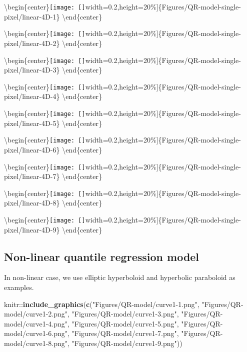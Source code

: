 \documentclass[11pt,a4paper,]{article}
\newenvironment{Shaded}{\begin{snugshade}}{\end{snugshade}}
\newcommand{\KeywordTok}[1]{\textcolor[rgb]{0.13,0.29,0.53}{\textbf{{#1}}}}
\newcommand{\StringTok}[1]{\textcolor[rgb]{0.31,0.60,0.02}{{#1}}}
\newcommand{\NormalTok}[1]{{#1}}
\theoremstyle{definition}
\theoremstyle{definition}
\theoremstyle{remark}
\begin{document}
\textbackslash{}begin\{center\}\texttt{[image: []}width=0.2\linewidth,height=20\%{]}\{Figures/QR-model-single-pixel/linear-4D-1\}
\textbackslash{}end\{center\}

\textbackslash{}begin\{center\}\texttt{[image: []}width=0.2\linewidth,height=20\%{]}\{Figures/QR-model-single-pixel/linear-4D-2\}
\textbackslash{}end\{center\}

\textbackslash{}begin\{center\}\texttt{[image: []}width=0.2\linewidth,height=20\%{]}\{Figures/QR-model-single-pixel/linear-4D-3\}
\textbackslash{}end\{center\}

\textbackslash{}begin\{center\}\texttt{[image: []}width=0.2\linewidth,height=20\%{]}\{Figures/QR-model-single-pixel/linear-4D-4\}
\textbackslash{}end\{center\}

\textbackslash{}begin\{center\}\texttt{[image: []}width=0.2\linewidth,height=20\%{]}\{Figures/QR-model-single-pixel/linear-4D-5\}
\textbackslash{}end\{center\}

\textbackslash{}begin\{center\}\texttt{[image: []}width=0.2\linewidth,height=20\%{]}\{Figures/QR-model-single-pixel/linear-4D-6\}
\textbackslash{}end\{center\}

\textbackslash{}begin\{center\}\texttt{[image: []}width=0.2\linewidth,height=20\%{]}\{Figures/QR-model-single-pixel/linear-4D-7\}
\textbackslash{}end\{center\}

\textbackslash{}begin\{center\}\texttt{[image: []}width=0.2\linewidth,height=20\%{]}\{Figures/QR-model-single-pixel/linear-4D-8\}
\textbackslash{}end\{center\}

\textbackslash{}begin\{center\}\texttt{[image: []}width=0.2\linewidth,height=20\%{]}\{Figures/QR-model-single-pixel/linear-4D-9\}
\textbackslash{}end\{center\}

\subsection{Non-linear quantile regression
model}\label{non-linear-quantile-regression-model}

In non-linear case, we use elliptic hyperboloid and hyperbolic
paraboloid as examples.

\begin{Shaded}
\begin{Highlighting}[]
\NormalTok{knitr::}\KeywordTok{include_graphics}\NormalTok{(}\KeywordTok{c}\NormalTok{(}\StringTok{"Figures/QR-model/curve1-1.png"}\NormalTok{,}
                          \StringTok{"Figures/QR-model/curve1-2.png"}\NormalTok{,}
                          \StringTok{"Figures/QR-model/curve1-3.png"}\NormalTok{,}
                          \StringTok{"Figures/QR-model/curve1-4.png"}\NormalTok{,}
                          \StringTok{"Figures/QR-model/curve1-5.png"}\NormalTok{,}
                          \StringTok{"Figures/QR-model/curve1-6.png"}\NormalTok{,}
                          \StringTok{"Figures/QR-model/curve1-7.png"}\NormalTok{,}
                          \StringTok{"Figures/QR-model/curve1-8.png"}\NormalTok{,}
                          \StringTok{"Figures/QR-model/curve1-9.png"}\NormalTok{))}
\end{Highlighting}
\end{Shaded}
\end{document}
